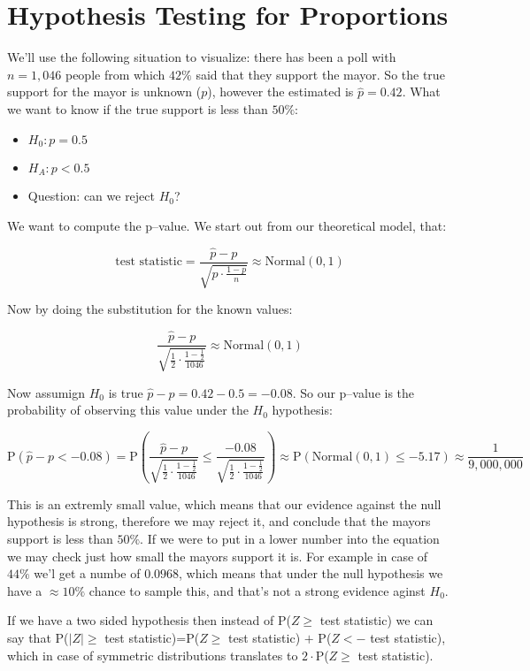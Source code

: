 \section{Hypothesis Testing for Proportions}

We'll use the following situation to visualize: there has been a poll with
$n=1,046$ people from which $42\%$ said that they support the mayor. So the true
support for the mayor is unknown ($p$), however the estimated is $\hat{p}=0.42$.
What we want to know if the true support is less than $50\%$:

\begin{itemize}
  \item $H_0: p = 0.5$
  \item $H_A: p < 0.5$
  \item Question: can we reject $H_0$?
\end{itemize}

We want to compute the p--value. We start out from our theoretical model, that:

\[ \mbox{test statistic} = \frac{\hat{p}-p}{\sqrt{p\cdot\frac{1-p}{n}}} \approx
\mbox{Normal}(0,1)
\]

Now by doing the substitution for the known values:

\[ \frac{\hat{p}-p}{\sqrt{\frac{1}{2}\cdot\frac{1-\frac{1}{2}}{1046}}} \approx
\mbox{Normal}(0,1)
\]
 
Now assumign $H_0$ is true $\hat{p}-p=0.42-0.5=-0.08$. So our p--value is the
probability of observing this value under the $H_0$ hypothesis:

\[ \mbox{P}(\hat{p}-p < -0.08) = \mbox{P} \left(
\frac{\hat{p}-p}{\sqrt{\frac{1}{2}\cdot\frac{1-\frac{1}{2}}{1046}}} \leq 
\frac{-0.08}{\sqrt{\frac{1}{2}\cdot\frac{1-\frac{1}{2}}{1046}}} \right)
\approx \mbox{P}\left( \mbox{Normal} \left( 0,1\right) \leq -5.17 \right)
\approx \frac{1}{9,000,000}
\]

This is an extremly small value, which means that our evidence against the null
hypothesis is strong, therefore we may reject it, and conclude that the mayors
support is less than $50\%$. If we were to put in a lower number into the
equation we may check just how small the mayors support it is. For example in
case of $44\%$ we'l get a numbe of $0.0968$, which means that under the null
hypothesis we have a $\approx 10\%$ chance to sample this, and that's not a
strong evidence aginst $H_0$.

If we have a two sided hypothesis then instead of P($Z \geq$  test statistic) we
can say that P($|Z| \geq$  test statistic)=P($Z \geq$  test statistic) $+$
P($Z <-$  test statistic), which in case of symmetric distributions
translates to $2\cdot$P($Z \geq$  test statistic).

